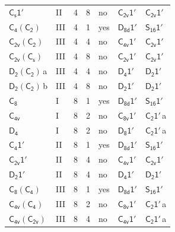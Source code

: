 \documentclass[10pt,a4paper]{article}
\numberwithin{equation}{section}
\newcommand{\grp}[1]{\mathsf{#1}}
\newcommand{\clsletter}[1]{\,{\scriptsize\color{black!55}#1}}
\begin{document}
{\begin{longtable}{@{}llrrlll@{}}
\href{C1v-1p.pdf}{$\grp{C_{s}1'}$} & II & 4 & 8 & no & \href{C2v-1p.pdf}{$\grp{C_{2v}1'}$} & \href{C2v-1p.pdf}{$\grp{C_{2v}1'}$}\\
\href{C4-C2.pdf}{$\grp{C_{4}}(\grp{C_{2}})$} & III & 4 & 1 & yes & \href{D8d-1p.pdf}{$\grp{D_{8d}1'}$} & \href{S16-1p.pdf}{$\grp{S_{16}1'}$}\\
\href{C2v-C2.pdf}{$\grp{C_{2v}}(\grp{C_{2}})$} & III & 4 & 4 & no & \href{C4v-1p.pdf}{$\grp{C_{4v}1'}$} & \href{C2v-1p.pdf}{$\grp{C_{2v}1'}$}\\
\href{C2v-C1v.pdf}{$\grp{C_{2v}}(\grp{C_{s}})$} & III & 4 & 8 & no & \href{C2v-1p.pdf}{$\grp{C_{2v}1'}$} & \href{C2v-1p.pdf}{$\grp{C_{2v}1'}$}\\
\href{D2-C2.pdf}{$\grp{D_{2}}(\grp{C_{2}})$}\clsletter{a} & III & 4 & 4 & no & \href{D4-1p.pdf}{$\grp{D_{4}1'}$} & \href{D2-1p.pdf}{$\grp{D_{2}1'}$}\\
\href{D2-C2.pdf}{$\grp{D_{2}}(\grp{C_{2}})$}\clsletter{b} & III & 4 & 8 & no & \href{D2-1p.pdf}{$\grp{D_{2}1'}$} & \href{D2-1p.pdf}{$\grp{D_{2}1'}$}\\
\href{../../../rotation/data/pdf/C8.pdf}{$\grp{C_{8}}$} & I & 8 & 1 & yes & \href{D8d-1p.pdf}{$\grp{D_{8d}1'}$} & \href{S16-1p.pdf}{$\grp{S_{16}1'}$}\\
\href{../../../rotation/data/pdf/C4v.pdf}{$\grp{C_{4v}}$} & I & 8 & 2 & no & \href{C8v-1p.pdf}{$\grp{C_{8v}1'}$} & \href{C2-1p.pdf}{$\grp{C_{2}1'}$}\clsletter{a}\\
\href{../../../rotation/data/pdf/D4.pdf}{$\grp{D_{4}}$} & I & 8 & 2 & no & \href{D8-1p.pdf}{$\grp{D_{8}1'}$} & \href{C2-1p.pdf}{$\grp{C_{2}1'}$}\clsletter{a}\\
\href{C4-1p.pdf}{$\grp{C_{4}1'}$} & II & 8 & 1 & yes & \href{D8d-1p.pdf}{$\grp{D_{8d}1'}$} & \href{S16-1p.pdf}{$\grp{S_{16}1'}$}\\
\href{C2v-1p.pdf}{$\grp{C_{2v}1'}$} & II & 8 & 4 & no & \href{C4v-1p.pdf}{$\grp{C_{4v}1'}$} & \href{C2v-1p.pdf}{$\grp{C_{2v}1'}$}\\
\href{D2-1p.pdf}{$\grp{D_{2}1'}$} & II & 8 & 4 & no & \href{D4-1p.pdf}{$\grp{D_{4}1'}$} & \href{D2-1p.pdf}{$\grp{D_{2}1'}$}\\
\href{C8-C4.pdf}{$\grp{C_{8}}(\grp{C_{4}})$} & III & 8 & 1 & yes & \href{D8d-1p.pdf}{$\grp{D_{8d}1'}$} & \href{S16-1p.pdf}{$\grp{S_{16}1'}$}\\
\href{C4v-C4.pdf}{$\grp{C_{4v}}(\grp{C_{4}})$} & III & 8 & 2 & no & \href{C8v-1p.pdf}{$\grp{C_{8v}1'}$} & \href{C2-1p.pdf}{$\grp{C_{2}1'}$}\clsletter{a}\\
\href{C4v-C2v.pdf}{$\grp{C_{4v}}(\grp{C_{2v}})$} & III & 8 & 4 & no & \href{C4v-1p.pdf}{$\grp{C_{4v}1'}$} & \href{C2-1p.pdf}{$\grp{C_{2}1'}$}\clsletter{a}\\

\end{longtable}}
\end{document}
